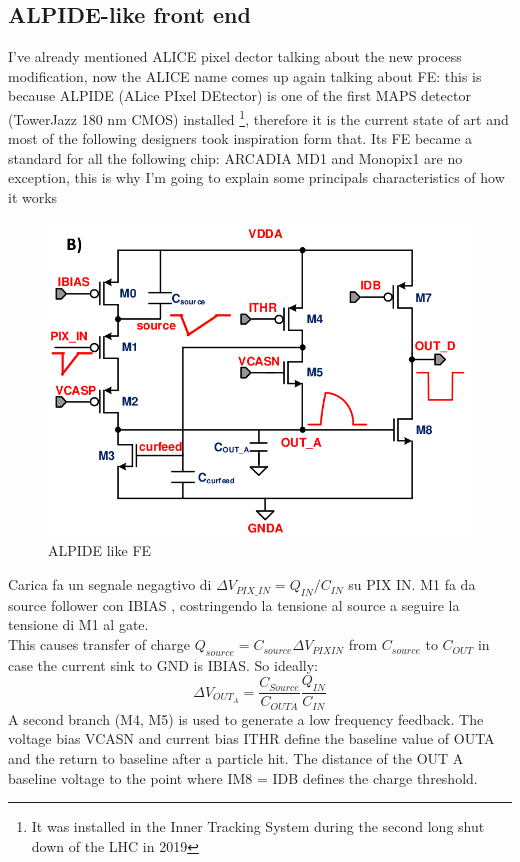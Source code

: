    \subsection{ALPIDE-like front end}
      I've already mentioned ALICE pixel dector talking about the new process modification, now the ALICE name comes up again talking about FE: this is because ALPIDE (ALice PIxel DEtector) is one of the first MAPS detector (TowerJazz 180 nm CMOS) installed \footnote{It was installed in the Inner Tracking System during the second long shut down of the LHC in 2019}, therefore it is the current state of art and most of the following designers took inspiration form that. Its FE became a standard for all the following chip: ARCADIA MD1 and Monopix1 are no exception, this is why I'm going to explain some principals characteristics of how it works\cite{ALPIDE-FE}
      \begin{figure}[h!]
         \centering
         \includegraphics[width=.7\linewidth]{figures/Pixel_detectors/ALPIDE_FE.png}
         \caption{ALPIDE like FE}
         \label{fig:ALPIDE-like}
      \end{figure}

      Carica fa un segnale negagtivo di $\Delta V_{PIX\_IN} = Q_{IN}/C_{IN}$ su PIX IN. 
      M1 fa da source follower con IBIAS , costringendo la tensione al source a seguire la tensione di M1
      al gate. \\
      This causes transfer of charge 
      $Q_{source}=C_{source}\Delta V_{PIXIN}$ from $C_{source}$ to $C_{OUT}$ in case the current sink
      to GND is IBIAS.
      So ideally:
      \begin{equation}
         \Delta V_{OUT_A} = \frac{C_{Source}}{C_{OUTA}}\frac{Q_{IN}}{C_{IN}}
      \end{equation}
      A second branch (M4, M5) is used to generate a low frequency feedback. 
      The voltage bias
      VCASN and current bias ITHR define the baseline value of OUTA and the return to baseline after
      a particle hit. The distance of the OUT A baseline voltage to the point where
      IM8 = IDB defines the charge threshold.
      
